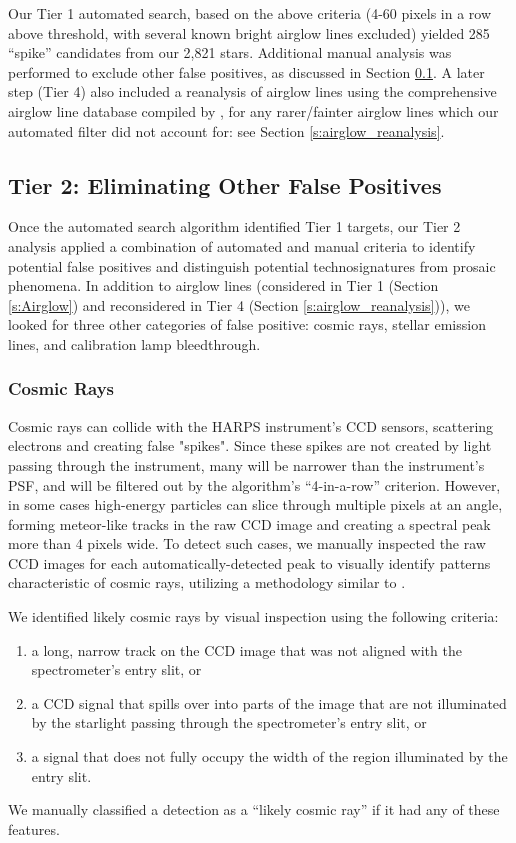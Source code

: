 \documentclass[twocolumn]{aastex701}
\begin{document}
Our Tier 1 automated search, based on the above criteria (4-60 pixels in a row above threshold, with several known bright airglow lines excluded) yielded 285 ``spike'' candidates from our 2,821 stars. Additional manual analysis was performed to exclude other false positives, as discussed in Section \ref{s:falsepositive}.  A later step (Tier 4) also included a reanalysis of airglow lines using the comprehensive airglow line database compiled by \cite{UVES_database}, for any rarer/fainter airglow lines which our automated filter did not account for: see Section \ref{s:airglow_reanalysis}. 

\subsection{Tier 2: Eliminating Other False Positives}
\label{s:falsepositive}
Once the automated search algorithm identified Tier 1 targets, our Tier 2 analysis applied a combination of automated and manual criteria to identify potential false positives and distinguish potential technosignatures from prosaic phenomena.  In addition to airglow lines (considered in Tier 1 (Section \ref{s:Airglow}) and reconsidered in Tier 4 (Section \ref{s:airglow_reanalysis})), we looked for three other categories of false positive: cosmic rays, stellar emission lines, and calibration lamp bleedthrough.

\subsubsection{Cosmic Rays}
\label{s:cosmic}
Cosmic rays can collide with the HARPS instrument's CCD sensors, scattering electrons and creating false "spikes". Since these spikes are not created by light passing through the instrument, many will be narrower than the instrument's PSF, and will be filtered out by the algorithm's ``4-in-a-row'' criterion.  However, in some cases high-energy particles can slice through multiple pixels at an angle, forming meteor-like tracks in the raw CCD image and creating a spectral peak more than 4 pixels wide.  To detect such cases, we manually inspected the raw CCD images for each automatically-detected peak to visually identify patterns characteristic of cosmic rays, utilizing a methodology similar to \cite{Tellis_2017}. 

We identified likely cosmic rays by visual inspection using the following criteria:
\begin{enumerate}
    \item a long, narrow track on the CCD image that was not aligned with the spectrometer's entry slit, or
    \item a CCD signal that spills over into parts of the image that are not illuminated by the starlight passing through the spectrometer's entry slit, or
    \item a signal that does not fully occupy the width of the region illuminated by the entry slit.
\end{enumerate}
We manually classified a detection as a ``likely cosmic ray'' if it had any of these features.
\end{document}
